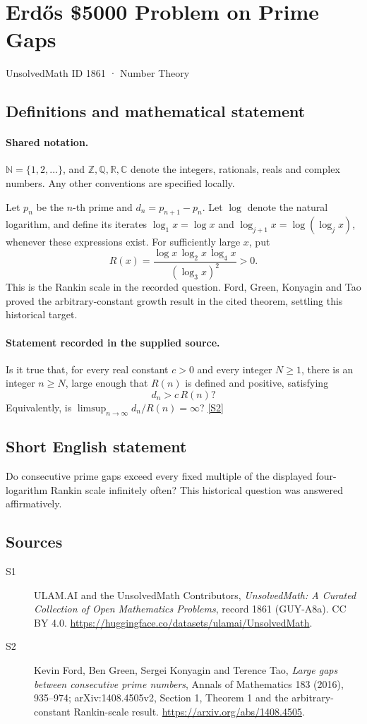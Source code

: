 \documentclass[11pt]{article}
\newcommand{\sref}[2]{\hyperlink{source:#1:#2}{[S#2]}}
\begin{document}
\setcounter{section}{1860}
\section{Erdős \$5000 Problem on Prime Gaps}\label{1861}
{\small\sffamily UnsolvedMath ID 1861 · Number Theory}
\subsection{Definitions and mathematical statement}

\paragraph{Shared notation.}$\mathbb N=\{1,2,\ldots\}$, and $\mathbb Z,\mathbb Q,\mathbb R,\mathbb C$ denote the integers, rationals, reals and complex numbers. Any other conventions are specified locally.


Let \(p_n\) be the \(n\)-th prime and
\(d_n=p_{n+1}-p_n\). Let \(\log\) denote the natural logarithm,
and define its iterates \(\log_1x=\log x\) and
\(\log_{j+1}x=\log(\log_jx)\), whenever these expressions exist.
For sufficiently large \(x\), put
\[
                     R(x)=\frac{\log x\,\log_2x\,\log_4x}
                                       {(\log_3x)^2}>0.
\]
This is the Rankin scale in the recorded question.
Ford, Green, Konyagin and Tao proved the arbitrary-constant growth
result in the cited theorem, settling this historical target.
\paragraph{Statement recorded in the supplied source.}
Is it true that, for every real constant \(c>0\) and every
integer \(N\ge1\), there is an integer \(n\ge N\), large enough
that \(R(n)\) is defined and positive, satisfying
\[
                         d_n>c\,R(n)?
\]
Equivalently, is \(\limsup_{n\to\infty}d_n/R(n)=\infty\)? \sref{1861}{2}
\subsection{Short English statement}
Do consecutive prime gaps exceed every fixed multiple of the displayed four-logarithm Rankin scale infinitely often? This historical question was answered affirmatively.
\subsection{Sources}
\begin{description}
\item[\hypertarget{source:1861:1}{S1}] ULAM.AI and the UnsolvedMath Contributors, \emph{UnsolvedMath: A Curated Collection of Open Mathematics Problems}, record 1861 (GUY-A8a). CC BY 4.0. \url{https://huggingface.co/datasets/ulamai/UnsolvedMath}.
\item[\hypertarget{source:1861:2}{S2}] Kevin Ford, Ben Green, Sergei Konyagin and Terence Tao, \emph{Large gaps between consecutive prime numbers}, Annals of Mathematics 183 (2016), 935--974; arXiv:1408.4505v2, Section 1, Theorem 1 and the arbitrary-constant Rankin-scale result. \url{https://arxiv.org/abs/1408.4505}.
\end{description}
\label{end:1861}
\end{document}
